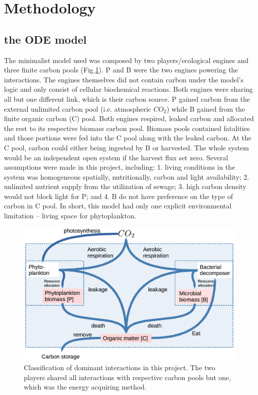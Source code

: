 \documentclass[../thesis.tex]{subfiles} %
\begin{document}
\section{Methodology}

\subsection{the ODE model}
The minimalist model used was composed by two players/ecological engines and three finite carbon pools (Fig.\ref{modelInWord}).  P and B were the two engines powering the interactions.  The engines themselves did not contain carbon under the model's logic and only consist of cellular biochemical reactions.  Both engines were sharing all but one different link, which is their carbon source.  P gained carbon from the external unlimited carbon pool (i.e. atmospheric $CO_2$) while B gained from the finite organic carbon (C) pool.  Both engines respired, leaked carbon and allocated the rest to its respective biomass carbon pool.  Biomass pools contained fatalities and those portions were fed into the C pool along with the leaked carbon.  At the C pool, carbon could either being ingested by B or harvested.  The whole system would be an independent open system if the harvest flux set zero.  Several assumptions were made in this project, including: 1. living conditions in the system was homogeneous spatially, nutritionally, carbon and light availability; 2. unlimited nutrient supply from the utilization of sewage;\autocite{markou2014microalgal} 3. high carbon density would not block light for P; and 4. B do not have preference on the type of carbon in C pool.  In short, this model had only one explicit environmental limitation -- living space for phytoplankton.

\begin{figure}[H]
    \centering
    \includegraphics[width=.8\linewidth]{media/model.png}
    \caption[Model visualization]{Classification of dominant interactions in this project.  The two players shared all interactions with respective carbon pools but one, which was the energy acquiring method.}
    \label{modelInWord}
\end{figure}
\end{document}
